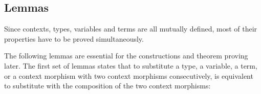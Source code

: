 \documentclass{sig-alternate}
\begin{document}
{\begin{code}
\>[48]\<%
\\
\>[0]\<[8]%
\>[8]        \<[25]%
\>[25]\<%
\\
\>[0]\<[8]%
\>[8]  \AgdaSymbol{\{\_\}} \AgdaSymbol{\{}  \AgdaSymbol{(} \AgdaInductiveConstructor{,} \AgdaSymbol{)\}} \AgdaSymbol{(} \AgdaInductiveConstructor{,} \AgdaSymbol{)} \AgdaSymbol{(} \AgdaInductiveConstructor{,} \AgdaSymbol{)}\<%
\\
\>  \AgdaSymbol{(} \AgdaSymbol{\_)} \AgdaSymbol{=} \<%
\\
%
\\
\>\<\end{code}
}


\subsection{Lemmas}

Since contexts, types, variables and
terms are all mutually defined, most of their properties have to
be proved simultaneously.

The following lemmas are essential for the constructions and theorem
proving later.  The first set of lemmas states that to substitute a
type, a variable, a term, or a context morphism with two context
morphisms consecutively, is equivalent to substitute with the
composition of the two context morphisms:
\end{document}
